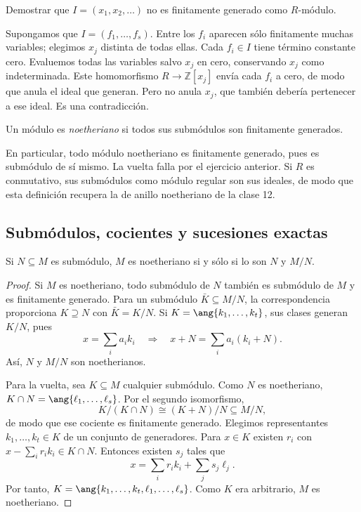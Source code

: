 \begin{ejer}\label{ejer:C15-infinitas}
Demostrar que $I=(x_1,x_2,\ldots)$ no es finitamente generado como $R$-módulo.
\end{ejer}
\begin{sol}
Supongamos que $I=(f_1,\ldots,f_s)$. Entre los $f_i$ aparecen sólo finitamente muchas variables; elegimos $x_j$ distinta de todas ellas. Cada $f_i\in I$ tiene término constante cero. Evaluemos todas las variables salvo $x_j$ en cero, conservando $x_j$ como indeterminada. Este homomorfismo $R\to\mathbb Z[x_j]$ envía cada $f_i$ a cero, de modo que anula el ideal que generan. Pero no anula $x_j$, que también debería pertenecer a ese ideal. Es una contradicción.
\end{sol}

\begin{defi}
Un módulo es \emph{noetheriano} si todos sus submódulos son finitamente generados.
\end{defi}
En particular, todo módulo noetheriano es finitamente generado, pues es submódulo de sí mismo. La vuelta falla por el ejercicio anterior. Si $R$ es conmutativo, sus submódulos como módulo regular son sus ideales, de modo que esta definición recupera la de anillo noetheriano de la clase 12.

\subsection{Submódulos, cocientes y sucesiones exactas}
\begin{prop}\label{prop:C15-extension}
Si $N\subseteq M$ es submódulo, $M$ es noetheriano si y sólo si lo son $N$ y $M/N$.
\end{prop}
\begin{proof}
Si $M$ es noetheriano, todo submódulo de $N$ también es submódulo de $M$ y es finitamente generado. Para un submódulo $\bar K\subseteq M/N$, la correspondencia proporciona $K\supseteq N$ con $\bar K=K/N$. Si $K=\ang{k_1,\ldots,k_t}$, sus clases generan $K/N$, pues
\[
x=\sum_i a_ik_i\quad\Longrightarrow\quad
x+N=\sum_i a_i(k_i+N).
\]
Así, $N$ y $M/N$ son noetherianos.

Para la vuelta, sea $K\subseteq M$ cualquier submódulo. Como $N$ es noetheriano, $K\cap N=\ang{\ell_1,\ldots,\ell_s}$. Por el segundo isomorfismo,
\[
K/(K\cap N)\cong(K+N)/N\subseteq M/N,
\]
de modo que ese cociente es finitamente generado. Elegimos representantes $k_1,\ldots,k_t\in K$ de un conjunto de generadores. Para $x\in K$ existen $r_i$ con $x-\sum_i r_ik_i\in K\cap N$. Entonces existen $s_j$ tales que
\[
x=\sum_i r_ik_i+\sum_j s_j\ell_j.
\]
Por tanto, $K=\ang{k_1,\ldots,k_t,\ell_1,\ldots,\ell_s}$. Como $K$ era arbitrario, $M$ es noetheriano.
\end{proof}

